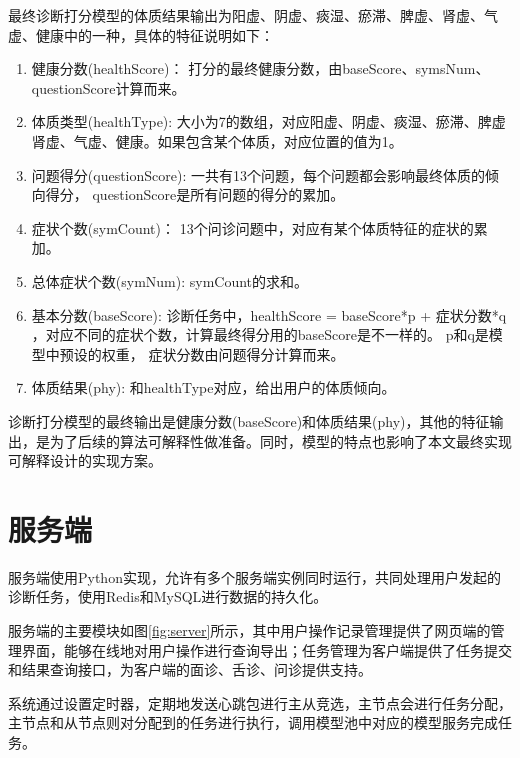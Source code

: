 最终诊断打分模型的体质结果输出为阳虚、阴虚、痰湿、瘀滞、脾虚、肾虚、气虚、健康中的一种，具体的特征说明如下：
\begin{enumerate}
    \item 健康分数(healthScore)： 打分的最终健康分数，由baseScore、symsNum、questionScore计算而来。

    \item 体质类型(healthType): 大小为7的数组，对应阳虚、阴虚、痰湿、瘀滞、脾虚肾虚、气虚、健康。如果包含某个体质，对应位置的值为1。

    \item 问题得分(questionScore): 一共有13个问题，每个问题都会影响最终体质的倾向得分， questionScore是所有问题的得分的累加。

    \item 症状个数(symCount)： 13个问诊问题中，对应有某个体质特征的症状的累加。

    \item 总体症状个数(symNum): symCount的求和。

    \item 基本分数(baseScore): 诊断任务中，healthScore = baseScore*p + 症状分数*q ，对应不同的症状个数，计算最终得分用的baseScore是不一样的。 
p和q是模型中预设的权重， 症状分数由问题得分计算而来。

    \item 体质结果(phy): 和healthType对应，给出用户的体质倾向。
\end{enumerate}

诊断打分模型的最终输出是健康分数(baseScore)和体质结果(phy)，其他的特征输出，是为了后续的算法可解释性做准备。同时，模型的特点也影响了本文最终实现可解释设计的实现方案。


\section{服务端}

服务端使用Python实现，允许有多个服务端实例同时运行，共同处理用户发起的诊断任务，使用Redis和MySQL进行数据的持久化。    

服务端的主要模块如图\ref{fig:server}所示，其中用户操作记录管理提供了网页端的管理界面，能够在线地对用户操作进行查询导出；任务管理为客户端提供了任务提交和结果查询接口，为客户端的面诊、舌诊、问诊提供支持。

系统通过设置定时器，定期地发送心跳包进行主从竞选，主节点会进行任务分配，主节点和从节点则对分配到的任务进行执行，调用模型池中对应的模型服务完成任务。



